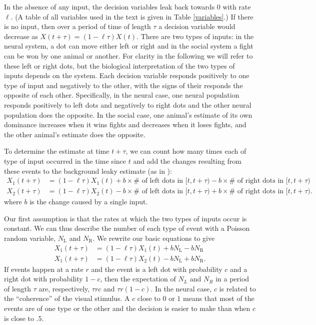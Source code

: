\documentclass{article}
\begin{document}
In the absence of any input, the decision variables leak back towards $0$ with rate $\ell$.  (A table of all variables used in the text is given in Table \ref{variables}.)  If there is no input, then over a period of time of length $\tau$ a decision variable would decrease as $X(t+\tau)=(1-\ell\tau)X(t)$.  There are two types of inputs: in the neural system, a dot can move either left or right and in the social system a fight can be won by one animal or another.  For clarity in the following we will refer to these left or right dots, but the biological interpretation of the two types of inputs depends on the system.  Each decision variable responds positively to one type of input and negatively to the other, with the signs of their responds the opposite of each other.  Specifically, in the neural case, one neural population responds positively to left dots and negatively to right dots and the other neural population does the opposite.  In the social case, one animal's estimate of its own dominance increases when it wins fights and decreases when it loses fights, and the other animal's estimate does the opposite.  

To determine the estimate at time $t+\tau$, we can count how many times each of type of input occurred in the time since $t$ and add the changes resulting from these events to the background leaky estimate (as in \cite{Gillespie:2000fk}):
\begin{align*}
X_1(t+\tau)&=(1-\ell\tau)X_1(t)+b\times\# \text{ of left dots in }[t,t+\tau)-b\times\# \text{ of right dots in }[t,t+\tau)
\\ X_2(t+\tau)&=(1-\ell\tau)X_2(t)-b\times\# \text{ of left dots in }[t,t+\tau)+b\times\# \text{ of right dots in }[t,t+\tau). 
\end{align*}
where $b$ is the change caused by a single input.

Our first assumption is that the rates at which the two types of inputs occur is constant.  We can thus describe the number of each type of event with a Poisson random variable, $N_\text{L}$ and $N_\text{R}$.  We rewrite our basic equations to give 
\begin{align*}
X_1(t+\tau)&=(1-\ell\tau)X_1(t)+bN_\text{L}-bN_\text{R}
\\ X_1(t+\tau)&=(1-\ell\tau)X_2(t)-bN_\text{L}+bN_\text{R}.
\end{align*}
If events happen at a rate $r$ and the event is a left dot with probability $c$ and a right dot with probability $1-c$, then the expectation of $N_L$ and $N_R$ in a period of length $\tau$ are, respectively, $\tau r c$ and $\tau r(1-c)$. In the neural case, $c$ is related to the ``coherence'' of the visual stimulus.  A $c$ close to $0$ or $1$ means that most of the events are of one type or the other and the decision is easier to make than when $c$ is close to $.5$.
\end{document}
